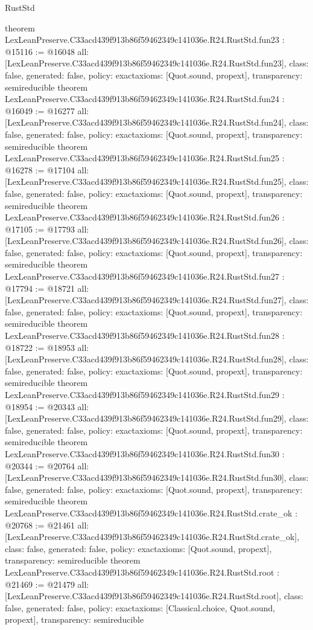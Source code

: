 \begin{lexlean}{RustStd}
\begin{coremodule}
{}
theorem LexLeanPreserve.C33acd439f913b86f59462349c141036e.R24.RustStd.fun23 : @15116 := @16048 {
  all: [LexLeanPreserve.C33acd439f913b86f59462349c141036e.R24.RustStd.fun23],
  class: false,
  generated: false,
  policy: exact{axioms: [Quot.sound, propext]},
  transparency: semireducible
}
theorem LexLeanPreserve.C33acd439f913b86f59462349c141036e.R24.RustStd.fun24 : @16049 := @16277 {
  all: [LexLeanPreserve.C33acd439f913b86f59462349c141036e.R24.RustStd.fun24],
  class: false,
  generated: false,
  policy: exact{axioms: [Quot.sound, propext]},
  transparency: semireducible
}
theorem LexLeanPreserve.C33acd439f913b86f59462349c141036e.R24.RustStd.fun25 : @16278 := @17104 {
  all: [LexLeanPreserve.C33acd439f913b86f59462349c141036e.R24.RustStd.fun25],
  class: false,
  generated: false,
  policy: exact{axioms: [Quot.sound, propext]},
  transparency: semireducible
}
theorem LexLeanPreserve.C33acd439f913b86f59462349c141036e.R24.RustStd.fun26 : @17105 := @17793 {
  all: [LexLeanPreserve.C33acd439f913b86f59462349c141036e.R24.RustStd.fun26],
  class: false,
  generated: false,
  policy: exact{axioms: [Quot.sound, propext]},
  transparency: semireducible
}
theorem LexLeanPreserve.C33acd439f913b86f59462349c141036e.R24.RustStd.fun27 : @17794 := @18721 {
  all: [LexLeanPreserve.C33acd439f913b86f59462349c141036e.R24.RustStd.fun27],
  class: false,
  generated: false,
  policy: exact{axioms: [Quot.sound, propext]},
  transparency: semireducible
}
theorem LexLeanPreserve.C33acd439f913b86f59462349c141036e.R24.RustStd.fun28 : @18722 := @18953 {
  all: [LexLeanPreserve.C33acd439f913b86f59462349c141036e.R24.RustStd.fun28],
  class: false,
  generated: false,
  policy: exact{axioms: [Quot.sound, propext]},
  transparency: semireducible
}
theorem LexLeanPreserve.C33acd439f913b86f59462349c141036e.R24.RustStd.fun29 : @18954 := @20343 {
  all: [LexLeanPreserve.C33acd439f913b86f59462349c141036e.R24.RustStd.fun29],
  class: false,
  generated: false,
  policy: exact{axioms: [Quot.sound, propext]},
  transparency: semireducible
}
theorem LexLeanPreserve.C33acd439f913b86f59462349c141036e.R24.RustStd.fun30 : @20344 := @20764 {
  all: [LexLeanPreserve.C33acd439f913b86f59462349c141036e.R24.RustStd.fun30],
  class: false,
  generated: false,
  policy: exact{axioms: [Quot.sound, propext]},
  transparency: semireducible
}
theorem LexLeanPreserve.C33acd439f913b86f59462349c141036e.R24.RustStd.crate_ok : @20768 := @21461 {
  all: [LexLeanPreserve.C33acd439f913b86f59462349c141036e.R24.RustStd.crate_ok],
  class: false,
  generated: false,
  policy: exact{axioms: [Quot.sound, propext]},
  transparency: semireducible
}
theorem LexLeanPreserve.C33acd439f913b86f59462349c141036e.R24.RustStd.root : @21469 := @21479 {
  all: [LexLeanPreserve.C33acd439f913b86f59462349c141036e.R24.RustStd.root],
  class: false,
  generated: false,
  policy: exact{axioms: [Classical.choice, Quot.sound, propext]},
  transparency: semireducible
}


\end{coremodule}
\end{lexlean}
